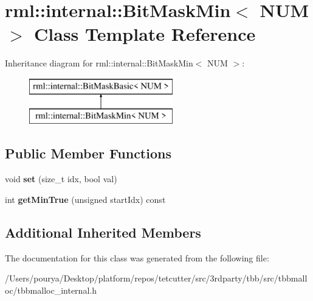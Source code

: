 \hypertarget{classrml_1_1internal_1_1BitMaskMin}{}\section{rml\+:\+:internal\+:\+:Bit\+Mask\+Min$<$ N\+U\+M $>$ Class Template Reference}
\label{classrml_1_1internal_1_1BitMaskMin}
Inheritance diagram for rml\+:\+:internal\+:\+:Bit\+Mask\+Min$<$ N\+U\+M $>$\+:\begin{figure}[H]
\begin{center}
\leavevmode
\includegraphics[height=2.000000cm]{classrml_1_1internal_1_1BitMaskMin}
\end{center}
\end{figure}
\subsection*{Public Member Functions}
\begin{DoxyCompactItemize}
\item 
\hypertarget{classrml_1_1internal_1_1BitMaskMin_aa5718330a8d423d2fdfb2bdd58960f5a}{}void {\bfseries set} (size\+\_\+t idx, bool val)\label{classrml_1_1internal_1_1BitMaskMin_aa5718330a8d423d2fdfb2bdd58960f5a}

\item 
\hypertarget{classrml_1_1internal_1_1BitMaskMin_a637fe492e85efbce0bc310931f156856}{}int {\bfseries get\+Min\+True} (unsigned start\+Idx) const \label{classrml_1_1internal_1_1BitMaskMin_a637fe492e85efbce0bc310931f156856}

\end{DoxyCompactItemize}
\subsection*{Additional Inherited Members}


The documentation for this class was generated from the following file\+:\begin{DoxyCompactItemize}
\item 
/\+Users/pourya/\+Desktop/platform/repos/tetcutter/src/3rdparty/tbb/src/tbbmalloc/tbbmalloc\+\_\+internal.\+h\end{DoxyCompactItemize}
